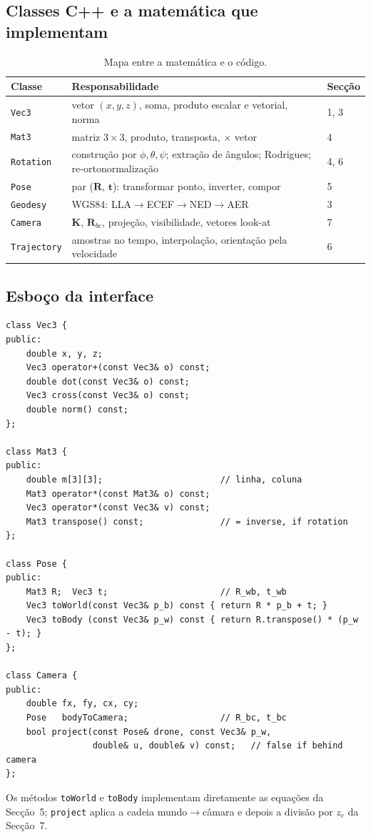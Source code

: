 \documentclass[11pt,a4paper]{article}
\newcommand{\vv}[1]{\mathbf{#1}}              %
\newcommand{\Rot}{\mathbf{R}}
\theoremstyle{definition}
\begin{document}
\subsection{Classes C++ e a matemática que implementam}
\begin{table}[H]
\centering
\begin{tabular}{p{3.2cm}p{7cm}p{3.6cm}}
\toprule
Classe & Responsabilidade & Secção\\
\midrule
\texttt{Vec3} & vetor $(x,y,z)$, soma, produto escalar e vetorial, norma & 1, 3\\
\texttt{Mat3} & matriz $3\times3$, produto, transposta, $\times$ vetor & 4\\
\texttt{Rotation} & construção por $\phi,\theta,\psi$; extração de ângulos; Rodrigues; re-ortonormalização & 4, 6\\
\texttt{Pose} & par ($\Rot$, $\vv{t}$): transformar ponto, inverter, compor & 5\\
\texttt{Geodesy} & WGS84: LLA$\to$ECEF$\to$NED$\to$AER & 3\\
\texttt{Camera} & $\mathbf{K}$, $\Rot_{bc}$, projeção, visibilidade, vetores look-at & 7\\
\texttt{Trajectory} & amostras no tempo, interpolação, orientação pela velocidade & 6\\
\bottomrule
\end{tabular}
\caption{Mapa entre a matemática e o código.}
\end{table}

\subsection{Esboço da interface}
\begin{lstlisting}
class Vec3 {
public:
    double x, y, z;
    Vec3 operator+(const Vec3& o) const;
    double dot(const Vec3& o) const;
    Vec3 cross(const Vec3& o) const;
    double norm() const;
};

class Mat3 {
public:
    double m[3][3];                       // linha, coluna
    Mat3 operator*(const Mat3& o) const;
    Vec3 operator*(const Vec3& v) const;
    Mat3 transpose() const;               // = inverse, if rotation
};

class Pose {
public:
    Mat3 R;  Vec3 t;                      // R_wb, t_wb
    Vec3 toWorld(const Vec3& p_b) const { return R * p_b + t; }
    Vec3 toBody (const Vec3& p_w) const { return R.transpose() * (p_w - t); }
};

class Camera {
public:
    double fx, fy, cx, cy;
    Pose   bodyToCamera;                  // R_bc, t_bc
    bool project(const Pose& drone, const Vec3& p_w,
                 double& u, double& v) const;   // false if behind camera
};
\end{lstlisting}
Os métodos \texttt{toWorld} e \texttt{toBody} implementam diretamente as equações da Secção~5; \texttt{project} aplica a cadeia mundo$\to$câmara e depois a divisão por $z_c$ da Secção~7.
\end{document}
